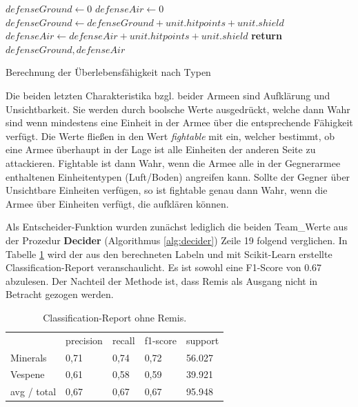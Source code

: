 \begin{algorithm}
\begin{algorithmic}[1]
	\State $defenseGround \leftarrow 0$
	\State $defenseAir \leftarrow 0$
			\State $defenseGround \leftarrow defenseGround + unit.hitpoints + unit.shield$
		\EndIf
			\State $defenseAir \leftarrow defenseAir + unit.hitpoints + unit.shield$
		\EndIf
	\EndFor 
	\State \textbf{return} $defenseGround, defenseAir$
\EndProcedure
\end{algorithmic}
\caption{Berechnung der Überlebensfähigkeit nach Typen}
\label{alg:leben}
\end{algorithm}

Die beiden letzten Charakteristika bzgl. beider Armeen sind Aufklärung und Unsichtbarkeit. Sie werden durch boolsche Werte ausgedrückt, welche dann Wahr sind wenn mindestens eine Einheit in der Armee über die entsprechende Fähigkeit verfügt. Die Werte fließen in den Wert \textit{fightable} mit ein, welcher bestimmt, ob eine Armee überhaupt in der Lage ist alle Einheiten der anderen Seite zu attackieren. Fightable ist dann Wahr, wenn die Armee alle in der Gegnerarmee enthaltenen Einheitentypen (Luft/Boden) angreifen kann. Sollte der Gegner über Unsichtbare Einheiten verfügen, so ist fightable genau dann Wahr, wenn die Armee über Einheiten verfügt, die aufklären können.

Als Entscheider-Funktion wurden zunächst lediglich die beiden Team\_Werte aus der Prozedur \textbf{Decider} (Algorithmus \ref{alg:decider}) Zeile 19 folgend verglichen. In Tabelle \ref{tb:classificationohneremis} wird der aus den berechneten Labeln und mit Scikit-Learn erstellte Classification-Report veranschaulicht. Es ist sowohl eine F1-Score von 0.67 abzulesen. Der Nachteil der Methode ist, dass Remis als Ausgang nicht in Betracht gezogen werden.  

\begin{table}
\centering
\caption{Classification-Report ohne Remis.}
\begin{tabular}{@{}lllll@{}}
\hline
& precision & recall & f1-score & support\\
Minerals & 0,71 & 0,74 & 0,72 & 56.027\\
Vespene & 0,61 & 0,58 & 0,59 & 39.921\\
 avg / total & 0,67 & 0,67 & 0,67 & 95.948\\
\hline
\end{tabular}
\label{tb:classificationohneremis}
\end{table}

